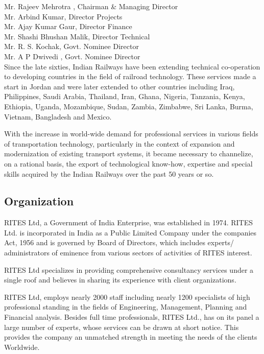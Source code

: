 Mr. Rajeev Mehrotra , Chairman \& Managing Director\\

Mr. Arbind Kumar, Director Projects \\

Mr. Ajay Kumar Gaur, Director Finance \\

Mr. Shashi Bhushan Malik,  Director Technical \\

Mr. R. S. Kochak, Govt. Nominee Director \\

Mr. A P Dwivedi , Govt. Nominee Director   \\


{\color[rgb]{0.0,0.0,0.04}
Since the late sixties, Indian Railways have been extending technical co-operation to developing countries in the field
of railroad technology. These services made a start in Jordan and were later extended to other countries including
Iraq, Philippines, Saudi Arabia, Thailand, Iran, Ghana, Nigeria, Tanzania, Kenya, Ethiopia, Uganda, Mozambique, Sudan,
Zambia, Zimbabwe, Sri Lanka, Burma, Vietnam, Bangladesh and Mexico.}


\bigskip

{\color[rgb]{0.0,0.0,0.039215688}
With the increase in world-wide demand for professional services in various fields of transportation technology,
particularly in the context of expansion and modernization of existing transport systems, it became necessary to
channelize, on a rational basis, the export of technological know-how, expertise and special skills acquired by the
Indian Railways over the past 50 years or so. }


\bigskip

\subsection{Organization}

\bigskip

{\color[rgb]{0.0,0.0,0.039215688}
RITES Ltd, a Government of India Enterprise, was established in 1974. RITES Ltd. is incorporated in India as a Public
Limited Company under the companies Act, 1956 and is governed by Board of Directors, which includes experts/
administrators of eminence from various sectors of activities of RITES interest. }


\bigskip

{\color[rgb]{0.0,0.0,0.039215688}
RITES Ltd specializes in providing comprehensive consultancy services under a single roof and believes in sharing its
experience with client organizations. \ }


\bigskip

{\color[rgb]{0.0,0.0,0.039215688}
RITES Ltd, employs nearly 2000 staff including nearly 1200 specialists of high professional standing in the fields of
Engineering, Management, Planning and Financial analysis. Besides full time professionals, RITES Ltd., has on its panel
a large number of experts, whose services can be drawn at short notice. This provides the company an unmatched strength
in meeting the needs of the clients Worldwide.}

